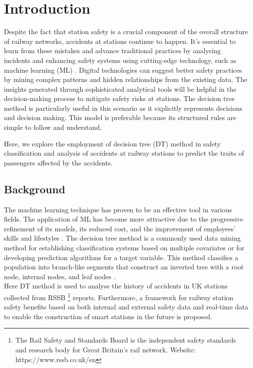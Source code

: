 \chapter{Introduction}
Despite the fact that station safety is a crucial component of the overall structure of railway networks, accidents at stations continue to happen. It's essential to learn from these mistakes and advance traditional practices by analysing incidents and enhancing safety systems using cutting-edge technology, such as machine learning (ML) \cite{alawad_learning_2020}. Digital technologies can suggest better safety practices by mining complex patterns and hidden relationships from the existing data. The insights generated through sophisticated analytical tools will be helpful in the decision-making process to mitigate safety risks at stations. The decision tree method is particularly useful in this scenario as it explicitly represents decisions and decision making. This model is preferable because its structured rules are simple to follow and understand. 

Here, we explore the employment of decision tree (DT) method in safety classification and analysis of accidents at railway stations to predict the traits of passengers affected by the accidents.

\section{Background}
The machine learning technique has proven to be an effective tool in various fields. The application of ML has become more attractive due to the progressive refinement of its models, its reduced cost, and the improvement of employees' skills and lifestyles \cite{EDIEKMANN199275}. The decision tree method is a commonly used data mining method for establishing classification systems based on multiple covariates or for developing prediction algorithms for a target variable. This method classifies a population into branch-like segments that construct an inverted tree with a root node, internal nodes, and leaf nodes \cite{song_decision_2015}.\\ 
Here DT method is used to analyse the history of accidents in UK stations collected from RSSB \footnote{The Rail Safety and Standards Board is the independent safety standards and research body for Great Britain’s rail network. Website: https://www.rssb.co.uk/en} reports. Furthermore, a framework for railway station safety benefits based on both internal and external safety data and real-time data to enable the construction of smart stations in the future is proposed. 

